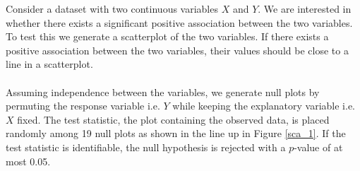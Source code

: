 Consider a dataset with two continuous variables $X$ and $Y$. 
We are interested in whether there exists a significant positive association between the two variables. To test this we generate a scatterplot of the two variables. If there exists a positive association between the two variables, their values should be close to a line in a scatterplot. \\ \\%
Assuming independence between the variables, we generate null plots by permuting the response variable i.e. $Y$ while keeping the explanatory variable i.e. $X$ fixed. 
The test statistic, the plot containing the observed data, is placed randomly among 19 null plots as shown in the line up in  Figure \ref{sca_1}. If the test statistic is identifiable, the null hypothesis is rejected with a $p$-value of at most 0.05.\\


%

